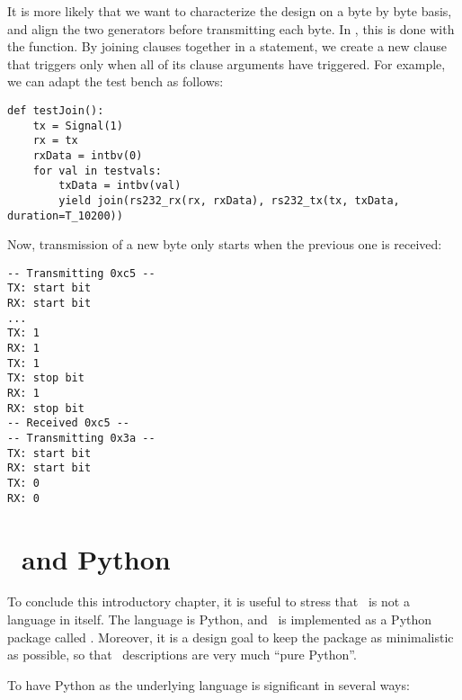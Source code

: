 It is more likely that we want to characterize the design on a byte
by byte basis, and align the two generators before transmitting each
byte. In \myhdl{}, this is done with the  function. By
joining clauses together in a  statement, we create a new
clause that triggers only when all of its clause arguments have
triggered. For example, we can adapt the test bench as follows:

\begin{verbatim}
def testJoin():
    tx = Signal(1)
    rx = tx
    rxData = intbv(0)
    for val in testvals:
        txData = intbv(val)
        yield join(rs232_rx(rx, rxData), rs232_tx(tx, txData, duration=T_10200))

\end{verbatim}

Now, transmission of a new byte only starts when the previous one is received:

\begin{verbatim}
-- Transmitting 0xc5 --
TX: start bit
RX: start bit
...
TX: 1
RX: 1
TX: 1
TX: stop bit
RX: 1
RX: stop bit
-- Received 0xc5 --
-- Transmitting 0x3a --
TX: start bit
RX: start bit
TX: 0
RX: 0

\end{verbatim}

\section{\myhdl\ and Python}

To conclude this introductory chapter, it is useful to stress that
\myhdl\ is not a language in itself. The language is Python, and \myhdl\ is
implemented as a Python package called .  Moreover, it is
a design goal to keep the  package as minimalistic as
possible, so that \myhdl\ descriptions are very much ``pure Python''.

To have Python as the underlying language is significant in several
ways:

